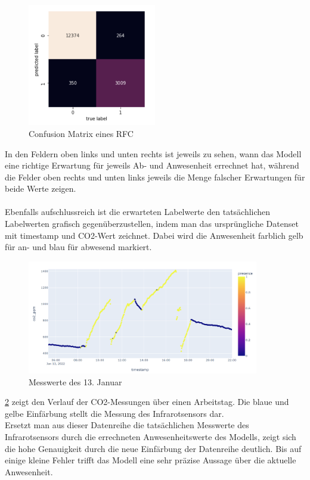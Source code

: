 \begin{figure}[h]
    \centering
    \includegraphics[width=0.5\textwidth]{pic/confusion_matrix.png}
    \caption{Confusion Matrix eines RFC}
    \label{fig:ConMatrix}
\end{figure}

In den Feldern oben links und unten rechts ist jeweils zu sehen, wann das Modell eine richtige Erwartung 
für jeweils Ab- und Anwesenheit errechnet hat, während die Felder oben rechts und unten links jeweils die 
Menge falscher Erwartungen für beide Werte zeigen.\\\\

\newpage
Ebenfalls aufschlussreich ist die erwarteten Labelwerte den tatsächlichen Labelwerten grafisch gegenüberzustellen, 
indem man das ursprüngliche Datenset mit timestamp und CO2-Wert zeichnet. Dabei wird die Anwesenheit 
farblich gelb für an- und blau für abwesend markiert.

\begin{figure}[h]
    \centering
    \includegraphics[width=0.9\textwidth]{pic/nov23_actual.png}
    \caption{Messwerte des 13. Januar}
    \label{fig:nov23}
\end{figure}

\ref{fig:nov23} zeigt den Verlauf der CO2-Messungen über einen Arbeitstag. Die blaue und gelbe Einfärbung stellt
die Messung des Infrarotsensors dar.\\ 
Ersetzt man aus dieser Datenreihe die tatsächlichen Messwerte des Infrarotsensors durch die errechneten 
Anwesenheitswerte des Modells, zeigt sich die hohe Genauigkeit durch die neue Einfärbung der Datenreihe deutlich. 
Bis auf einige kleine Fehler trifft das Modell eine sehr präzise Aussage über die aktuelle Anwesenheit.


